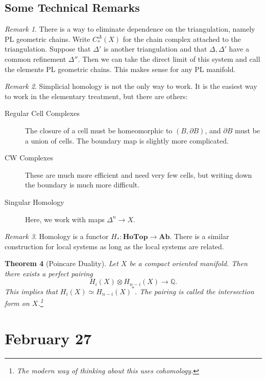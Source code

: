 \documentclass[leqno, openany]{memoir}
\newtheorem{thm}{Theorem}[chapter]
\theoremstyle{definition}
\theoremstyle{remark}
\newtheorem{rmk}[thm]{Remark}
\theoremstyle{plain}
\theoremstyle{definition}
\theoremstyle{remark}
\newcommand{\Q}{\mathbb{Q}}
\begin{document}
\section{Some Technical Remarks}%

\begin{rmk} There is a way to eliminate dependence on the triangulation, namely
    PL geometric chains. Write $C_*^{\Delta}(X)$ for the chain complex attached
    to the triangulation. Suppose that $\Delta'$ is another triangulation and
    that $\Delta, \Delta'$ have a common refinement $\Delta''$. Then we can
    take the direct limit of this system and call the elements PL geometric
    chains. This makes sense for any PL manifold.  \end{rmk}

\begin{rmk} Simplicial homology is not the only way to work. It is the easiest
    way to work in the elementary treatment, but there are others:
    \begin{description} \item[Regular Cell Complexes] The closure of a cell
        must be homeomorphic to $(B, \partial B)$, and $\partial B$ must be a
        union of cells. The boundary map is slightly more complicated.
    \item[CW Complexes] These are much more efficient and need very few cells,
        but writing down the boundary is much more difficult.  \item[Singular
        Homology] Here, we work with maps $\Delta^n \to X$.  \end{description}
    \end{rmk}

\begin{rmk} Homology is a functor $H_*: \mathbf{HoTop} \to \mathbf{Ab}$. There
is a similar construction for local systems as long as the local systems are
related.  \end{rmk}

\begin{thm}[Poincare Duality] Let $X$ be a compact oriented manifold. Then
    there exists a perfect pairing \[ H_i(X) \otimes H_{n-i}(X) \to \Q. \] This
    implies that $H_i(X) \simeq H_{n-i}(X)^*$. The pairing is called the
    \emph{intersection form} on $X$.\footnote{The modern way of thinking about
    this uses cohomology.} \end{thm}

\chapter{February 27}%
\end{document}
